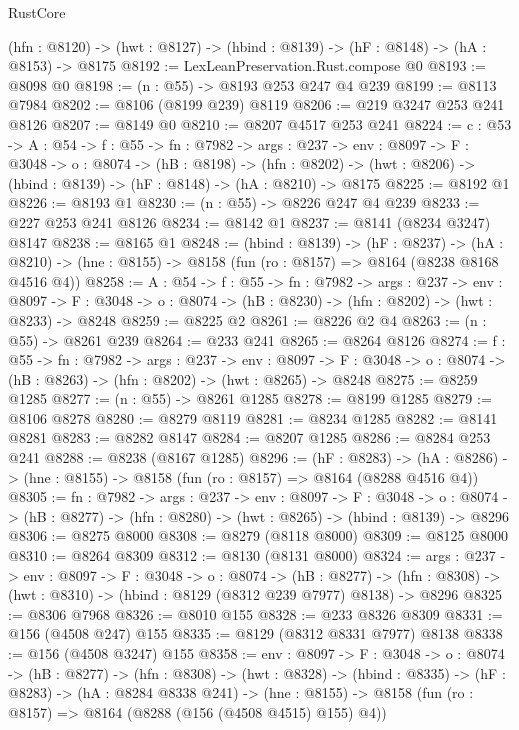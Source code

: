 \begin{lexlean}{RustCore}
\begin{coremodule}
  (hfn : @8120) -> (hwt : @8127) -> (hbind : @8139) -> (hF : @8148) -> (hA : @8153) -> @8175
@8192 := LexLeanPreservation.Rust.compose @0
@8193 := @8098 @0
@8198 := (n : @55) -> @8193 @253 @247 @4 @239
@8199 := @8113 @7984
@8202 := @8106 (@8199 @239) @8119
@8206 := @219 @3247 @253 @241 @8126
@8207 := @8149 @0
@8210 := @8207 @4517 @253 @241
@8224 := {c : @53} ->
  {A : @54} ->
  {f : @55} ->
  {fn : @7982} ->
  {args : @237} ->
  {env : @8097} ->
  {F : @3048} ->
  {o : @8074} ->
  (hB : @8198) ->
  (hfn : @8202) -> (hwt : @8206) -> (hbind : @8139) -> (hF : @8148) -> (hA : @8210) -> @8175
@8225 := @8192 @1
@8226 := @8193 @1
@8230 := (n : @55) -> @8226 @247 @4 @239
@8233 := @227 @253 @241 @8126
@8234 := @8142 @1
@8237 := @8141 (@8234 @3247) @8147
@8238 := @8165 @1
@8248 := (hbind : @8139) ->
  (hF : @8237) ->
  (hA : @8210) -> (hne : @8155) -> @8158 (fun (ro : @8157) => @8164 (@8238 @8168 @4516 @4))
@8258 := {A : @54} ->
  {f : @55} ->
  {fn : @7982} ->
  {args : @237} ->
  {env : @8097} ->
  {F : @3048} -> {o : @8074} -> (hB : @8230) -> (hfn : @8202) -> (hwt : @8233) -> @8248
@8259 := @8225 @2
@8261 := @8226 @2 @4
@8263 := (n : @55) -> @8261 @239
@8264 := @233 @241
@8265 := @8264 @8126
@8274 := {f : @55} ->
  {fn : @7982} ->
  {args : @237} ->
  {env : @8097} ->
  {F : @3048} -> {o : @8074} -> (hB : @8263) -> (hfn : @8202) -> (hwt : @8265) -> @8248
@8275 := @8259 @1285
@8277 := (n : @55) -> @8261 @1285
@8278 := @8199 @1285
@8279 := @8106 @8278
@8280 := @8279 @8119
@8281 := @8234 @1285
@8282 := @8141 @8281
@8283 := @8282 @8147
@8284 := @8207 @1285
@8286 := @8284 @253 @241
@8288 := @8238 (@8167 @1285)
@8296 := (hF : @8283) ->
  (hA : @8286) -> (hne : @8155) -> @8158 (fun (ro : @8157) => @8164 (@8288 @4516 @4))
@8305 := {fn : @7982} ->
  {args : @237} ->
  {env : @8097} ->
  {F : @3048} ->
  {o : @8074} -> (hB : @8277) -> (hfn : @8280) -> (hwt : @8265) -> (hbind : @8139) -> @8296
@8306 := @8275 @8000
@8308 := @8279 (@8118 @8000)
@8309 := @8125 @8000
@8310 := @8264 @8309
@8312 := @8130 (@8131 @8000)
@8324 := {args : @237} ->
  {env : @8097} ->
  {F : @3048} ->
  {o : @8074} ->
  (hB : @8277) ->
  (hfn : @8308) -> (hwt : @8310) -> (hbind : @8129 (@8312 @239 @7977) @8138) -> @8296
@8325 := @8306 @7968
@8326 := @8010 @155
@8328 := @233 @8326 @8309
@8331 := @156 (@4508 @247) @155
@8335 := @8129 (@8312 @8331 @7977) @8138
@8338 := @156 (@4508 @3247) @155
@8358 := {env : @8097} ->
  {F : @3048} ->
  {o : @8074} ->
  (hB : @8277) ->
  (hfn : @8308) ->
  (hwt : @8328) ->
  (hbind : @8335) ->
  (hF : @8283) ->
  (hA : @8284 @8338 @241) ->
  (hne : @8155) -> @8158 (fun (ro : @8157) => @8164 (@8288 (@156 (@4508 @4515) @155) @4))

\end{coremodule}
\end{lexlean}

